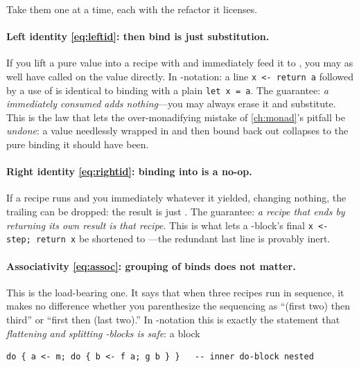 \noindent Take them one at a time, each with the refactor it licenses.

\paragraph{Left identity \eqref{eq:leftid}:  then bind is just
substitution.} If you lift a pure value into a recipe with  and
immediately feed it to , you may as well have called  on the value
directly. In -notation: a line
\lstinline[style=l4style]|x <- return a| followed by a use of  is identical
to binding  with a plain \lstinline[style=l4style]|let x = a|. The guarantee:
\emph{a  immediately consumed adds nothing}---you may always erase it and
substitute. This is the law that lets the over-monadifying mistake of
\cref{ch:monad}'s pitfall be \emph{undone}: a value needlessly wrapped in
 and then bound back out collapses to the pure binding it should have
been.

\paragraph{Right identity \eqref{eq:rightid}: binding into  is a
no-op.} If a recipe  runs and you immediately  whatever it
yielded, changing nothing, the trailing  can be dropped: the result is
just . The guarantee: \emph{a recipe that ends by returning its own result is
that recipe}. This is what lets a -block's final
\lstinline[style=l4style]|x <- step; return x| be shortened to ---the
redundant last line is provably inert.

\paragraph{Associativity \eqref{eq:assoc}: grouping of binds does not matter.} This
is the load-bearing one. It says that when three recipes run in sequence, it makes no
difference whether you parenthesize the sequencing as ``(first two) then third'' or
``first then (last two).'' In -notation this is exactly the statement that
\emph{flattening and splitting -blocks is safe}: a block

\begin{lstlisting}[style=l4style]
do { a <- m; do { b <- f a; g b } }   -- inner do-block nested
\end{lstlisting}

